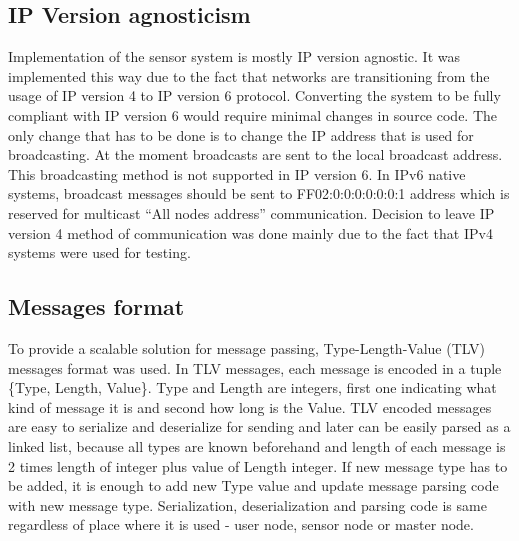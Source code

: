 \subsection{IP Version agnosticism}
\label{subsec:ipveragn}
Implementation of the sensor system is mostly IP version agnostic. It was implemented this way due to the fact that networks are transitioning from the usage of IP version 4 to IP version 6 protocol. Converting the system to be fully compliant with IP version 6 would require minimal changes in source code. The only change that has to be done is to change the IP address that is used for broadcasting. At the moment broadcasts are sent to the local broadcast address. This broadcasting method is not supported in IP version 6. In IPv6 native systems, broadcast messages should be sent to FF02:0:0:0:0:0:0:1 address which is reserved for multicast ``All nodes address'' communication. Decision to leave IP version 4 method of communication was done mainly due to the fact that IPv4 systems were used for testing.

\subsection{Messages format}
\label{subsec:msgformat}
To provide a scalable solution for message passing, Type-Length-Value (TLV) messages format was used. In TLV messages, each message is encoded in a tuple \{Type, Length, Value\}. Type and Length are integers, first one indicating what kind of message it is and second how long is the Value. TLV encoded messages are easy to serialize and deserialize for sending and later can be easily parsed as a linked list, because all types are known beforehand and length of each message is 2 times length of integer plus value of Length integer. If new message type has to be added, it is enough to add new Type value and update message parsing code with new message type. Serialization, deserialization and parsing code is same regardless of place where it is used - user node, sensor node or master node.  

